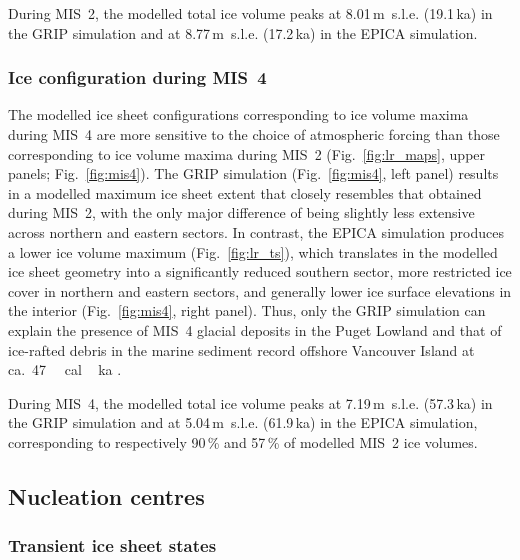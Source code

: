 \documentclass[tc, manuscript]{copernicus}
\begin{document}
During MIS~2, the modelled total ice volume peaks at 8.01\,m~s.l.e. (19.1\,ka)
in the GRIP simulation and at 8.77\,m~s.l.e. (17.2\,ka) in the EPICA
simulation.

\subsubsection{Ice configuration during MIS~4}
\label{sec:mis4}

The modelled ice sheet configurations corresponding to ice volume maxima during
MIS~4 are more sensitive to the choice of atmospheric forcing than those
corresponding to ice volume maxima during MIS~2 (Fig.~\ref{fig:lr_maps},
upper panels;
Fig.~\ref{fig:mis4}). The GRIP simulation (Fig.~\ref{fig:mis4}, left panel)
results in a modelled maximum ice sheet extent that closely resembles that
obtained during MIS~2, with the only major difference of being slightly less
extensive across
northern and eastern sectors. In contrast, the EPICA simulation produces a lower
ice volume maximum (Fig.~\ref{fig:lr_ts}), which translates in the
modelled ice sheet geometry into a significantly reduced southern sector, more
restricted ice cover in northern and eastern sectors, and generally lower
ice surface elevations in the interior (Fig.~\ref{fig:mis4}, right panel).
Thus, only the GRIP simulation can explain the presence of MIS~4 glacial
deposits in the Puget Lowland \citep{Troost.2014} and that of ice-rafted debris
in the marine sediment record offshore Vancouver Island at
ca.~47\,\unit{\,cal\,ka} \citep{Cosma.etal.2008}.

During MIS~4, the modelled total ice volume peaks at 7.19\,m~s.l.e. (57.3\,ka)
in the GRIP simulation and at 5.04\,m~s.l.e. (61.9\,ka) in the EPICA
simulation, corresponding to respectively 90\,\% and 57\,\% of modelled MIS~2
ice volumes.

\subsection{Nucleation centres}

\subsubsection{Transient ice sheet states}
\end{document}
